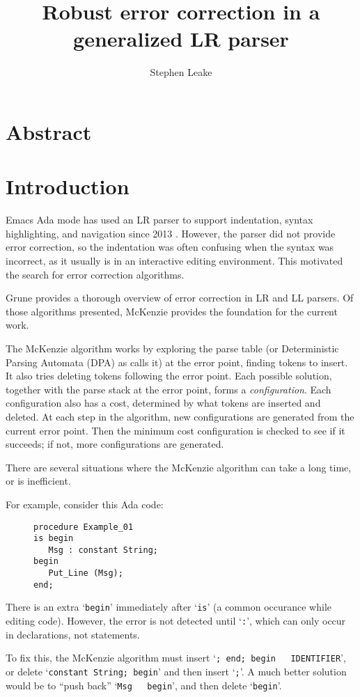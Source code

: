 \documentclass{article}
\title{Robust error correction in a generalized LR parser}
\author{Stephen Leake}
\newcommand{\code}[1]{`\lstinline|#1|'}
\begin{document}
\section{Abstract}

\section{Introduction}
Emacs Ada mode has used an LR parser to support indentation, syntax
highlighting, and navigation since 2013 \cite{Emacs Ada mode news}.
However, the parser did not provide error correction, so the
indentation was often confusing when the syntax was incorrect, as it
usually is in an interactive editing environment. This motivated the
search for error correction algorithms.

Grune \cite{Grune 2008} provides a thorough overview of error correction in
LR and LL parsers. Of those algorithms presented, McKenzie \cite{McKenzie 1995}
provides the foundation for the current work.

The McKenzie algorithm works by exploring the parse table (or
Deterministic Parsing Automata (DPA) as \cite{McKenzie 1995} calls it)
at the error point, finding tokens to insert. It also tries deleting
tokens following the error point. Each possible solution, together
with the parse stack at the error point, forms a
\textit{configuration}. Each configuration also has a cost, determined
by what tokens are inserted and deleted. At each step in the
algorithm, new configurations are generated from the current error
point. Then the minimum cost configuration is checked to see if it
succeeds; if not, more configurations are generated.

There are several situations where the McKenzie algorithm can take a
long time, or is inefficient.

For example, consider this Ada code:
\begin{figure}[H]
\begin{lstlisting}
procedure Example_01
is begin
   Msg : constant String;
begin
   Put_Line (Msg);
end;
\end{lstlisting}
\caption{}
\label{ex:extra_begin_1}
\end{figure}

There is an extra \code{begin} immediately after \code{is} (a common
occurance while editing code). However, the error is not detected
until \code{:}, which can only occur in declarations, not statements.

To fix this, the McKenzie algorithm must insert \code{; end; begin
  IDENTIFIER}, or delete \code{constant String; begin} and then insert
\code{;}. A much better solution would be to ``push back'' \code{Msg
  begin}, and then delete \code{begin}.
\end{document}
